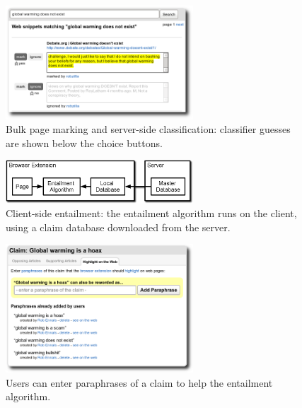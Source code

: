\documentclass{www2010-submission}
\begin{document}
\begin{figure}[tb]
	\begin{center}
	\includegraphics[width=7cm]{pictures/training2.png}
	\caption{Bulk page marking and server-side classification: classifier guesses are shown below the choice buttons.}
	\label{training}
	\end{center}
\end{figure}

\begin{figure}[t]
	\begin{center}
	\includegraphics[width=7cm]{pictures/nlp_client_server2.png}
	\caption{Client-side entailment: the entailment algorithm runs on the client, using a claim database downloaded from the server.}
	\label{nlp_client_server}
	\end{center}
\end{figure}

\begin{figure}[tb]
	\begin{center}
	\includegraphics[width=7cm]{pictures/paraphrases.png}
	\caption{Users can enter paraphrases of a claim to help the entailment algorithm.}
	\label{paraphrases}
	\end{center}
\end{figure}
\end{document}
